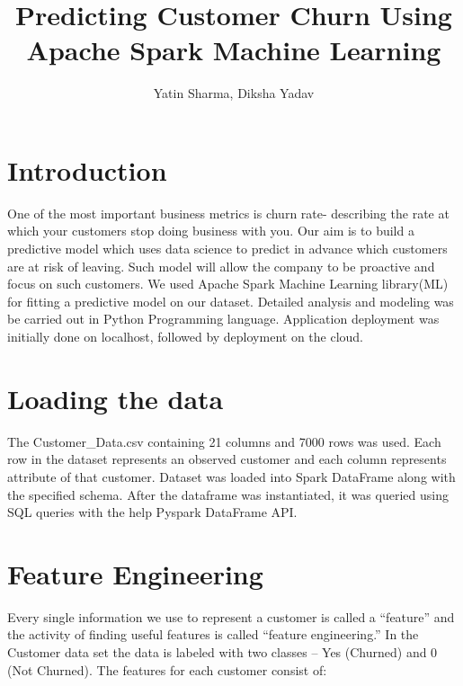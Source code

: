 \documentclass[9pt,twocolumn,twoside]{../../styles/osajnl}
\title{Predicting Customer Churn Using Apache Spark Machine Learning}
\author[1,*]{Yatin Sharma, Diksha Yadav}
\affil[1]{School of Informatics and Computing, Bloomington, IN 47408, U.S.A.}
\affil[*]{Corresponding authors: yatins@indiana.edu, yadavd@iu.edu}
\begin{document}
\flushbottom %

\maketitle %

\tableofcontents %
\maketitle

\section{Introduction}
	One of the most important business metrics is churn rate- describing the rate at which your customers stop doing business with you. Our aim is to build a predictive model which uses data science to predict in advance which customers are at risk of leaving. Such model will allow the company to be proactive and focus on such customers. We used Apache Spark\cite{www-apache-spark} Machine Learning library(ML)\cite{www-Spark-ML} for fitting a predictive model on our dataset. Detailed analysis and modeling was be carried out in Python Programming language. Application deployment was initially done on localhost, followed by deployment on the cloud.


\section{Loading the data}
The Customer_Data.csv containing 21 columns and 7000 rows was used. Each row in the dataset represents an observed customer and each column represents attribute of that customer. Dataset was loaded into Spark DataFrame \cite{Spark-Dataframe} along with the specified schema. After the dataframe was instantiated, it was queried using SQL queries with the help Pyspark DataFrame API.

\section{Feature Engineering}
Every single information we use to represent a customer is called a “feature” and the activity of finding useful features is called “feature engineering.” In the Customer data set the data is labeled with two classes – Yes (Churned) and 0 (Not Churned). The features for each customer consist of:
	\ 
\end{document}

